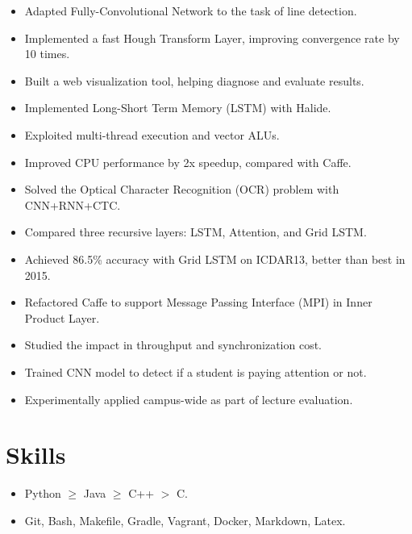 \documentclass[letterpaper,11pt]{article}
\begin{document}
\begin{itemize}
  \begin{itemize}
  \item Adapted Fully-Convolutional Network to the task of line detection.
  \item Implemented a fast Hough Transform Layer, improving convergence rate by 10 times.
  \item Built a web visualization tool, helping diagnose and evaluate results.
  \end{itemize}
  \begin{itemize}
  \item Implemented Long-Short Term Memory (LSTM) with Halide.
  \item Exploited multi-thread execution and vector ALUs.
  \item Improved CPU performance by 2x speedup, compared with Caffe.  \end{itemize}
  \begin{itemize}
  \item Solved the Optical Character Recognition (OCR) problem with CNN+RNN+CTC.
  \item Compared three recursive layers: LSTM, Attention, and Grid LSTM.
  \item Achieved 86.5\% accuracy with Grid LSTM on ICDAR13, better than best in 2015.
  \end{itemize}
  \begin{itemize}
  \item Refactored Caffe to support Message Passing Interface (MPI) in Inner Product Layer.
  \item Studied the impact in throughput and synchronization cost.
  \end{itemize}
  \begin{itemize}
  \item Trained CNN model to detect if a student is paying attention or not.
  \item Experimentally applied campus-wide as part of lecture evaluation.
  \end{itemize}
\end{itemize}

\section*{Skills}
\begin{itemize}
\item Python $\ge$ Java $\ge$ C++ $>$ C.
\item Git, Bash, Makefile, Gradle, Vagrant, Docker, Markdown, Latex.
\end{itemize}
\end{document}
